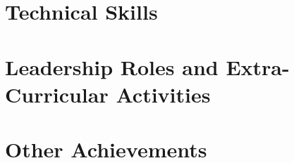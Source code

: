 \documentclass[margin,line]{res}
\begin{document}
\begin{resume}
\section{\sc Technical Skills}
    
\section{\sc Leadership Roles and Extra-Curricular Activities}
    
\section{\sc Other Achievements}
    
%     
\end{resume}
\end{document}
